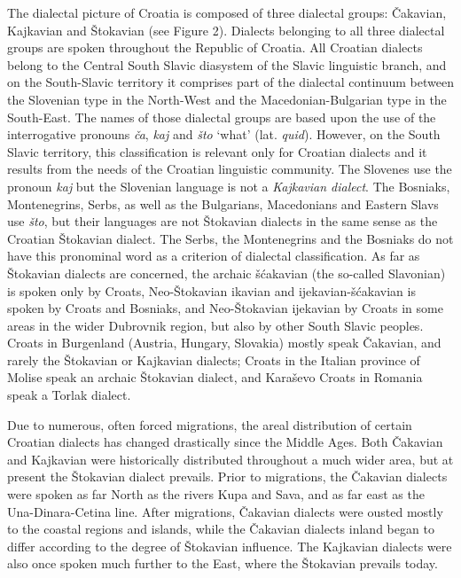 \begin{multicols}{2}
The dialectal picture of Croatia is composed of three dialectal groups: Čakavian, Kajkavian and Štokavian (see Figure 2). Dialects belonging to all three dialectal groups are spoken throughout the Republic of Croatia. All Croatian dialects belong to the Central South Slavic diasystem of the Slavic linguistic branch, and on the South-Slavic territory it comprises part of the dialectal continuum between the Slovenian type in the North-West and the Macedonian-Bulgarian type in the South-East. The names of those dialectal groups are based upon the use of the interrogative pronouns \emph{ča}, \emph{kaj} and \emph{što} ‘what’ (lat. \emph{quid}). However, on the South Slavic territory, this classification is relevant only for Croatian dialects and it results from the needs of the Croatian linguistic community. The Slovenes use the pronoun \emph{kaj} but the Slovenian language is not a \emph{Kajkavian dialect}. The Bosniaks, Montenegrins, Serbs, as well as the Bulgarians, Macedonians and Eastern Slavs use \emph{što}, but their languages are not Štokavian dialects in the same sense as the Croatian Štokavian dialect. The Serbs, the Montenegrins and the Bosniaks do not have this pronominal word as a criterion of dialectal classification. As far as Štokavian dialects are concerned, the archaic šćakavian (the so-called Slavonian) is spoken only by Croats, Neo-Štokavian ikavian and ijekavian-šćakavian is spoken by Croats and Bosniaks, and Neo-Štokavian ijekavian by Croats in some areas in the wider Dubrovnik region, but also by other South Slavic peoples. Croats in Burgenland (Austria, Hungary, Slovakia) mostly speak Čakavian, and rarely the Štokavian or Kajkavian dialects; Croats in the Italian province of Molise speak an archaic Štokavian dialect, and Karaševo Croats in Romania speak a Torlak dialect.

Due to numerous, often forced migrations, the areal distribution of certain Croatian dialects has changed drastically since the Middle Ages. Both Čakavian and Kajkavian were historically distributed throughout a much wider area, but at present the Štokavian dialect prevails. Prior to migrations, the Čakavian dialects were spoken as far North as the rivers Kupa and Sava, and as far east as the Una-Dinara-Cetina line. After migrations, Čakavian dialects were ousted mostly to the coastal regions and islands, while the Čakavian dialects inland began to differ according to the degree of Štokavian influence. The Kajkavian dialects were also once spoken much further to the East, where the Štokavian prevails today.


\end{multicols}
